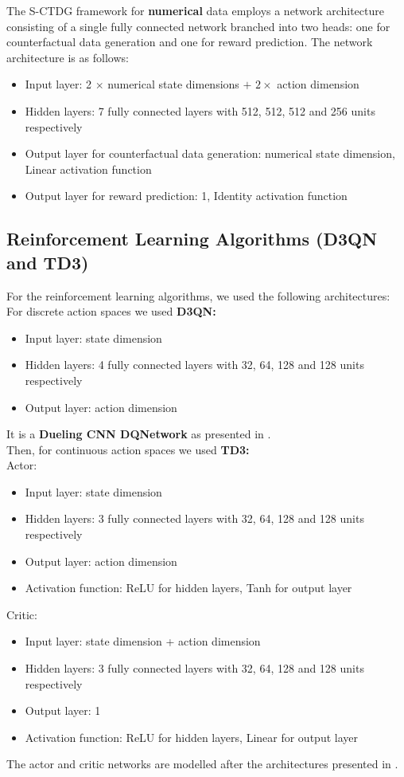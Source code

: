 The S-CTDG framework for \textbf{numerical} data
employs a network architecture consisting of a single
fully connected network branched into two heads:
one for counterfactual data generation
and one for reward prediction.
The network architecture is as follows:
\begin{itemize}
    \item Input layer: 2 $\times$ numerical state dimensions
    $ + $ $2 \times $ action dimension
    \item Hidden layers: 7 fully connected layers with
    512, 512, 512 and 256 units respectively
    \item Output layer for counterfactual data generation:
    numerical state dimension, Linear activation function
    \item Output layer for reward prediction: 1,
    Identity activation function
\end{itemize}

\subsection{Reinforcement Learning Algorithms (D3QN and TD3)}

For the reinforcement learning algorithms, we used the following architectures:\\
For discrete action spaces we used \textbf{D3QN:}
\begin{itemize}
    \item Input layer: state dimension
    \item Hidden layers: 4 fully connected layers with 32, 64, 128 and 128
    units respectively
    \item Output layer: action dimension
\end{itemize}
It is a \textbf{Dueling CNN DQNetwork} as presented in \cite{d3qn}.\\
Then, for continuous action spaces we used \textbf{TD3:}\\
Actor:
\begin{itemize}
    \item Input layer: state dimension
    \item Hidden layers: 3 fully connected layers with 32, 64, 128 and 128
    units respectively
    \item Output layer: action dimension
    \item Activation function: ReLU for hidden layers, Tanh for output layer
\end{itemize}
Critic:
\begin{itemize}
    \item Input layer: state dimension + action dimension
    \item Hidden layers: 3 fully connected layers with 32, 64, 128 and 128
    units respectively
    \item Output layer: 1
    \item Activation function: ReLU for hidden layers, Linear for output layer
\end{itemize}
The actor and critic networks are modelled after
the architectures presented in \cite{lillicrap2019}. 


